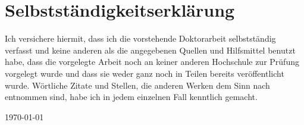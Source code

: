 
\section*{Selbstständigkeitserklärung}

Ich versichere hiermit, dass ich die vorstehende Doktorarbeit selbstständig verfasst und
keine anderen als die angegebenen Quellen und Hilfsmittel benutzt habe, dass die
vorgelegte Arbeit noch an keiner anderen Hochschule zur Prüfung vorgelegt wurde und dass
sie weder ganz noch in Teilen bereits veröffentlicht wurde. Wörtliche Zitate und
Stellen, die anderen Werken dem Sinn nach entnommen sind, habe ich in jedem einzelnen
Fall kenntlich gemacht.

\vspace{\baselineskip}

\noindent%
\datengerman\today

\vspace{3\baselineskip}

\noindent \dissauthor

\thispagestyle{empty}
